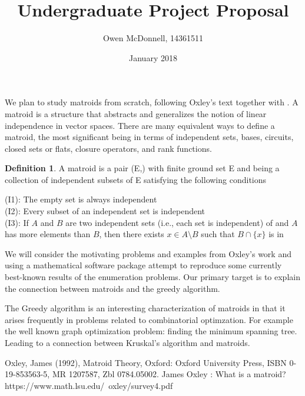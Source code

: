 \documentclass{article}
\title{Undergraduate Project Proposal}
\author{Owen McDonnell, 14361511}
\date{January 2018}
\theoremstyle{plain}
\theoremstyle{definition}
\newtheorem{defn}{Definition}[section]
\theoremstyle{remark}
\begin{document}
\maketitle

We plan to study matroids from scratch, following Oxley's text \cite{ox_book} together with \cite{ox_paper}. A matroid is a structure that abstracts and generalizes the notion of linear independence in vector spaces. There are many equivalent ways to define a matroid, the most significant being in terms of independent sets, bases, circuits, closed sets or flats, closure operators, and rank functions.\\
\begin{defn}
A matroid is a pair (E,) with finite ground set E and  being a collection of independent subsets of E satisfying the following conditions

\vspace{2mm}

\noindent (I1): The empty set is always independent\\
\noindent (I2): Every subset of an independent set is independent\\
\noindent (I3): If $ A $ and $ B $ are two independent sets (i.e., each set is independent) of  and $ A $ has more elements than $ B $, then there exists $ x \in A \setminus B $ such that $ B \cap \{ x \} $ is in 
\end{defn}

\vspace{2mm}

We will consider the motivating problems and examples from Oxley's work and using a mathematical software package attempt to reproduce some currently best-known results of the enumeration problems. Our primary target is to explain the connection between matroids and the greedy algorithm.

\vspace{1mm}

The Greedy algorithm is an interesting characterization of matroids in that it arises frequently in problems related to combinatorial optimzation. For example the well known graph optimization problem: finding the minimum spanning tree. Leading to a connection between Kruskal's algorithm and matroids.

\begin{thebibliography}{}
    Oxley, James (1992), Matroid Theory, Oxford: Oxford University Press, ISBN 0-19-853563-5, MR 1207587, Zbl 0784.05002.
    James Oxley : What is a matroid? https://www.math.lsu.edu/~oxley/survey4.pdf
    
    

\end{thebibliography}
\end{document}
